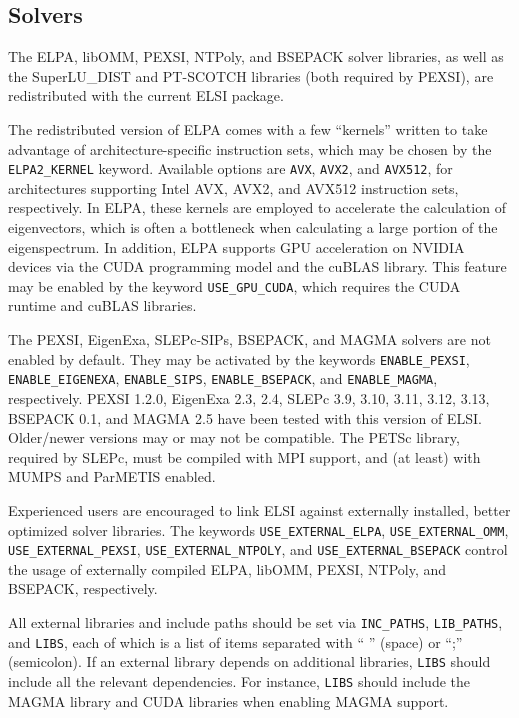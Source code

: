 \documentclass{report}
\begin{document}
\subsection{Solvers}
\label{subsec:config_solvers}
The ELPA, libOMM, PEXSI, NTPoly, and BSEPACK solver libraries, as well as the SuperLU\_DIST and PT-SCOTCH libraries (both required by PEXSI), are redistributed with the current ELSI package.

The redistributed version of ELPA comes with a few ``kernels'' written to take advantage of architecture-specific instruction sets, which may be chosen by the \texttt{ELPA2\_KERNEL} keyword. Available options are \texttt{AVX}, \texttt{AVX2}, and \texttt{AVX512}, for architectures supporting Intel AVX, AVX2, and AVX512 instruction sets, respectively. In ELPA, these kernels are employed to accelerate the calculation of eigenvectors, which is often a bottleneck when calculating a large portion of the eigenspectrum. In addition, ELPA supports GPU acceleration on NVIDIA devices via the CUDA programming model and the cuBLAS library. This feature may be enabled by the keyword \texttt{USE\_GPU\_CUDA}, which requires the CUDA runtime and cuBLAS libraries.

The PEXSI, EigenExa, SLEPc-SIPs, BSEPACK, and MAGMA solvers are not enabled by default. They may be activated by the keywords \texttt{ENABLE\_PEXSI}, \texttt{ENABLE\_EIGENEXA}, \texttt{ENABLE\_SIPS}, \texttt{ENABLE\_BSEPACK}, and \texttt{ENABLE\_MAGMA}, respectively. PEXSI 1.2.0, EigenExa 2.3, 2.4, SLEPc 3.9, 3.10, 3.11, 3.12, 3.13, BSEPACK 0.1, and MAGMA 2.5 have been tested with this version of ELSI. Older/newer versions may or may not be compatible. The PETSc library, required by SLEPc, must be compiled with MPI support, and (at least) with MUMPS and ParMETIS enabled.

Experienced users are encouraged to link ELSI against externally installed, better optimized solver libraries. The keywords \texttt{USE\_EXTERNAL\_ELPA}, \texttt{USE\_EXTERNAL\_OMM}, \texttt{USE\_EXTERNAL\_PEXSI}, \texttt{USE\_EXTERNAL\_NTPOLY}, and \texttt{USE\_EXTERNAL\_BSEPACK} control the usage of externally compiled ELPA, libOMM, PEXSI, NTPoly, and BSEPACK, respectively.

All external libraries and include paths should be set via \texttt{INC\_PATHS}, \texttt{LIB\_PATHS}, and \texttt{LIBS}, each of which is a list of items separated with `` '' (space) or ``;'' (semicolon). If an external library depends on additional libraries, \texttt{LIBS} should include all the relevant dependencies. For instance, \texttt{LIBS} should include the MAGMA library and CUDA libraries when enabling MAGMA support.
\end{document}
